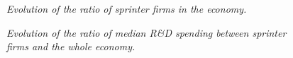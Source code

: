 \documentclass[letterpaper,12pt]{article}
\theoremstyle{definition}
\begin{document}
\begin{figure}[!htbp]\centering \captionsetup{width=5.8in}
    \caption{\label{fig:CBFirms}\textit{Evolution of the ratio of sprinter firms in the economy.}}
\end{figure}

\begin{figure}[!htbp]\centering \captionsetup{width=5.8in}
    \caption{\label{fig:RD_spending_rat}\textit{Evolution of the ratio of median R\&D spending between sprinter firms and the whole economy.}}
\end{figure}
\end{document}
